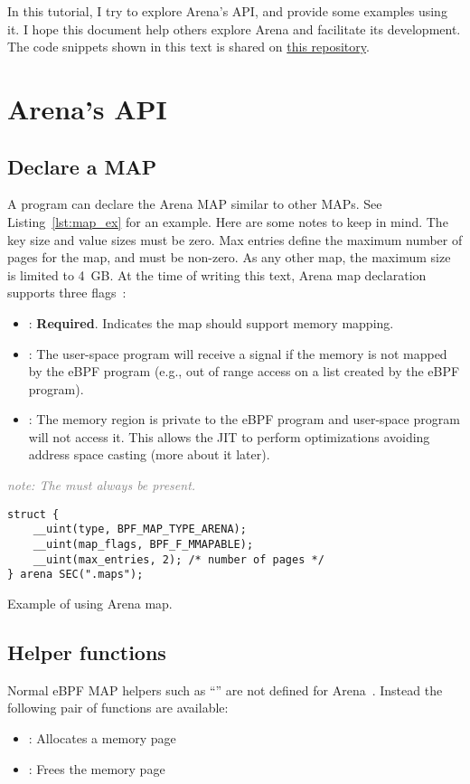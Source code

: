 \documentclass{article}
\begin{document}
In this tutorial, I try to explore Arena's API, and provide some examples using
it. I hope this document help others explore Arena and facilitate its
development. The code snippets shown in this text is shared on
\href{https://github.com/bpf-endeavor/ebpf-arena-tutorial}{this repository}.

\section{Arena's API}

\subsection{Declare a MAP}
A program can declare the Arena MAP similar to other MAPs. See Listing~\ref{lst:map_ex}
for an example. Here are some notes to keep in mind. The key size and value
sizes must be zero. Max entries define the maximum number of pages for the map,
and must be non-zero. As any other map, the maximum size is limited to 4~GB. At
the time of writing this text, Arena map declaration supports three
flags~\cite{arena_source}:
\begin{itemize}
    \item {}: \textbf{Required}. Indicates the map should
        support memory mapping.
    \item {}: The user-space program will receive a
         signal if the memory is not mapped by the eBPF program
        (e.g., out of range access on a list created by the eBPF program).
    \item {}: The memory region is private to the eBPF
        program and user-space program will not access it. This allows the JIT
        to perform optimizations avoiding address space casting (more about it
        later).
\end{itemize}
\textcolor{gray}{\textit{note: The  must always be present.}}

\centering
\begin{listing}
\begin{verbatim}
struct {
    __uint(type, BPF_MAP_TYPE_ARENA);
    __uint(map_flags, BPF_F_MMAPABLE);
    __uint(max_entries, 2); /* number of pages */
} arena SEC(".maps");
\end{verbatim}
    \caption{Example of using Arena map.}
    \label{lst:map_ex}
\end{listing}

\subsection{Helper functions}
Normal eBPF MAP helpers such as ``'' are not
defined for Arena~\cite{arena_source}. Instead the following pair of functions
are available:
\begin{itemize}
    \item {}: Allocates a memory page
    \item {}: Frees the memory page
\end{itemize}
\end{document}
